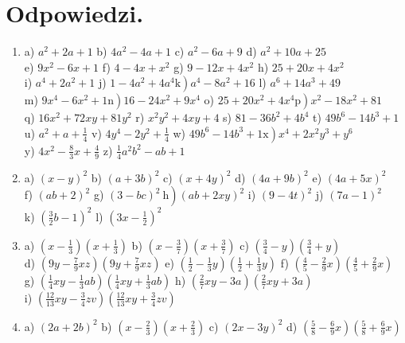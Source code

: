 \documentclass[10pt]{article}
\begin{document}
\section*{Odpowiedzi.}
\begin{enumerate}
  \item a) \(a^{2}+2 a+1\) b) \(4 a^{2}-4 a+1\) c) \(a^{2}-6 a+9\) d) \(a^{2}+10 a+25\)\\
e) \(9 x^{2}-6 x+1\) f) \(4-4 x+x^{2}\) g) \(9-12 x+4 x^{2}\) h) \(25+20 x+4 x^{2}\)\\
i) \(a^{4}+2 a^{2}+1\) j) \(\left.1-4 a^{2}+4 a^{4} \mathrm{k}\right) a^{4}-8 a^{2}+16\) l) \(a^{6}+14 a^{3}+49\)\\
m) \(\left.9 x^{4}-6 x^{2}+1 \mathrm{n}\right) 16-24 x^{2}+9 x^{4}\) o) \(\left.25+20 x^{2}+4 x^{4} \mathrm{p}\right) x^{2}-18 x^{2}+81\)\\
q) \(16 x^{2}+72 x y+81 y^{2}\) r) \(x^{2} y^{2}+4 x y+4\) s) \(81-36 b^{2}+4 b^{4}\) t) \(49 b^{6}-14 b^{3}+1\)\\
u) \(a^{2}+a+\frac{1}{4}\) v) \(4 y^{4}-2 y^{2}+\frac{1}{4}\) w) \(\left.49 b^{6}-14 b^{3}+1 \mathrm{x}\right) x^{4}+2 x^{2} y^{3}+y^{6}\)\\
y) \(4 x^{2}-\frac{8}{3} x+\frac{4}{9}\) z) \(\frac{1}{4} a^{2} b^{2}-a b+1\)
  \item a) \((x-y)^{2}\) b) \((a+3 b)^{2}\) c) \((x+4 y)^{2}\) d) \((4 a+9 b)^{2}\) e) \((4 a+5 x)^{2}\)\\
f) \((a b+2)^{2}\) g) \(\left.(3-b c)^{2} \mathrm{~h}\right)(a b+2 x y)^{2}\) i) \((9-4 t)^{2}\) j) \((7 a-1)^{2}\)\\
k) \(\left(\frac{3}{2} b-1\right)^{2}\) l) \(\left(3 x-\frac{1}{2}\right)^{2}\)
  \item a) \(\left(x-\frac{1}{3}\right)\left(x+\frac{1}{3}\right)\) b) \(\left(x-\frac{3}{7}\right)\left(x+\frac{3}{7}\right)\) c) \(\left(\frac{3}{4}-y\right)\left(\frac{3}{4}+y\right)\)\\
d) \(\left(9 y-\frac{7}{9} x z\right)\left(9 y+\frac{7}{9} x z\right)\) e) \(\left(\frac{1}{2}-\frac{1}{3} y\right)\left(\frac{1}{2}+\frac{1}{3} y\right)\) f) \(\left(\frac{4}{5}-\frac{2}{9} x\right)\left(\frac{4}{5}+\frac{2}{9} x\right)\)\\
g) \(\left(\frac{1}{4} x y-\frac{1}{3} a b\right)\left(\frac{1}{4} x y+\frac{1}{3} a b\right)\) h) \(\left(\frac{2}{7} x y-3 a\right)\left(\frac{2}{7} x y+3 a\right)\)\\
i) \(\left(\frac{12}{13} x y-\frac{3}{4} z v\right)\left(\frac{12}{13} x y+\frac{3}{4} z v\right)\)
  \item a) \((2 a+2 b)^{2}\) b) \(\left(x-\frac{2}{3}\right)\left(x+\frac{2}{3}\right)\) c) \((2 x-3 y)^{2}\) d) \(\left(\frac{5}{8}-\frac{6}{9} x\right)\left(\frac{5}{8}+\frac{6}{9} x\right)\)\\

\end{enumerate}
\end{document}
